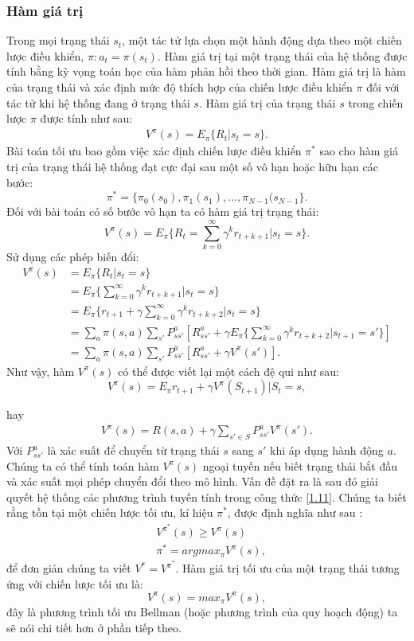 \subsubsection{Hàm giá trị}
	Trong mọi trạng thái $s_{t}$, một tác tử lựa chọn một hành động dựa theo một chiến lược điều khiển, $ \pi: a_{t}=\pi(s_{t})$. Hàm giá trị tại một trạng thái của hệ thống được tính bằng kỳ vọng toán học của hàm phản hồi theo thời gian. Hàm giá trị là hàm của trạng thái và xác định mức độ thích hợp của chiến lược điều khiển $\pi$ đối với tác tử khi hệ thống đang ở trạng thái $s$. Hàm giá trị của trạng thái $s$ trong chiến lược $\pi$ được tính như sau:
\begin{align*}
V^{\pi}(s)=E_{\pi} \lbrace R_{t}|s_{t}=s\rbrace.
\end{align*}
	Bài toán tối ưu bao gồm việc xác định chiến lược điều khiển $\pi ^{*}$ sao cho hàm giá trị của trạng thái hệ thống đạt cực đại sau một số vô hạn hoặc hữu hạn các bước:
	$$ \pi^{*}= \lbrace \pi_{0}(s_{0}),\pi_{1}(s_{1}),...,\pi_{N-1}(s_{N-1} \rbrace.$$
	Đối với bài toán có số bước vô hạn ta có hàm giá trị trạng thái:
	$$ V^{\pi}(s)=E_{\pi} \lbrace R_{t}=\sum_{k=0}^{\infty}\gamma^{k}r_{t+k+1}|s_{t}=s \rbrace. $$
	Sử dụng các phép biến đổi:
	\begin{align*}
	V^{\pi}(s)&= E_{\pi} \lbrace R_{t}|s_{t}=s \rbrace \\
	&=E_{\pi} \lbrace \sum_{k=0}^{\infty} \gamma^{k} r_{t+k+1}|s_{t}=s \rbrace \\
	&=E_{\pi} \lbrace r_{t+1}+\gamma\sum_{k=0}^{\infty} \gamma^{k}r_{t+k+2}|s_{t}=s \rbrace\\
	&=\sum_{a} \pi(s,a) \sum_{s'} P_{ss'}^{a} [R_{ss'}^{a}+\gamma E_{\pi} \lbrace \sum_{k=0}^{\infty}\gamma^{k}r_{t+k+2}|s_{t+1}=s' \rbrace ]\\
	&=\sum_{a}\pi(s,a) \sum_{s'} P_{ss'}^{a}[R_{ss'}^{a}+\gamma V^{\pi}(s')].
	\end{align*}
	Như vậy, hàm $V^\pi (s)$ có thể được viết lại một cách đệ qui như sau:
$$V^\pi(s)=E_{\pi} {r_{t+1}+\gamma V^\pi (S_{t+1})|S_t=s},$$

hay
\begin{align}\label{1.11}
V^\pi(s)=R(s,a)+\gamma \sum_{s' \in S} P_{ss'}^{a}V^\pi (s').
\end{align}
Với $P_{ss'}^{a}$ là xác suất để chuyển từ trạng thái $s$ sang $s'$ khi áp dụng hành động $a$. Chúng ta có thể tính toán hàm $V^\pi(s)$ ngoại tuyến nếu biết trạng thái bắt đầu và xác suất mọi phép chuyển đổi theo mô hình. Vấn đề đặt ra là sau đó giải quyết hệ thống các phương trình tuyến tính trong công thức \ref{1.11}. Chúng ta biết rằng tồn tại một chiến lược tối ưu, kí hiệu $\pi^*$, được định nghĩa như sau :
\begin{align*}
&V^{\pi^*}(s) \geq V^\pi(s)\\
&\pi^* =argmax_\pi {V^\pi(s)},
\end{align*}
để đơn giản chúng ta viết $V^*=V^{\pi^*}$. Hàm giá trị tối ưu của một trạng thái tương ứng với chiến lược tối ưu là:
$$V^\pi(s)=max_\pi {V^\pi(s)},$$
đây là phương trình tối ưu Bellman (hoặc phương trình của quy hoạch động) ta sẽ nói chi tiết hơn ở phần tiếp theo.\\


